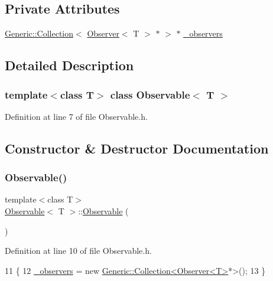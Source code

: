 \subsection*{Private Attributes}
\begin{DoxyCompactItemize}
\item 
\mbox{\hyperlink{classGeneric_1_1Collection}{Generic\+::\+Collection}}$<$ \mbox{\hyperlink{classObserver}{Observer}}$<$ T $>$ $\ast$ $>$ $\ast$ \mbox{\hyperlink{classObservable_ae6028589035c86e8a9c4375306dca702}{\+\_\+observers}}
\end{DoxyCompactItemize}


\subsection{Detailed Description}
\subsubsection*{template$<$class T$>$\newline
class Observable$<$ T $>$}



Definition at line 7 of file Observable.\+h.



\subsection{Constructor \& Destructor Documentation}
\mbox{\label{classObservable_a6cec7a5329100b5d45b078ff4bcd5f88}} 
\subsubsection{\texorpdfstring{Observable()}{Observable()}}
{\footnotesize\ttfamily template$<$class T$>$ \\
\mbox{\hyperlink{classObservable}{Observable}}$<$ T $>$\+::\mbox{\hyperlink{classObservable}{Observable}} (\begin{DoxyParamCaption}{ }\end{DoxyParamCaption})\hspace{0.3cm}{\ttfamily [inline]}}



Definition at line 10 of file Observable.\+h.


\begin{DoxyCode}
11     \{
12         \mbox{\hyperlink{classObservable_ae6028589035c86e8a9c4375306dca702}{\_observers}} = \textcolor{keyword}{new} \mbox{\hyperlink{classGeneric_1_1Collection}{Generic::Collection<Observer<T>}}*>();
13     \}
\end{DoxyCode}
\mbox{\label{classObservable_a6d06df1c0feb2ce5a30c6fb7119c4045}} 

